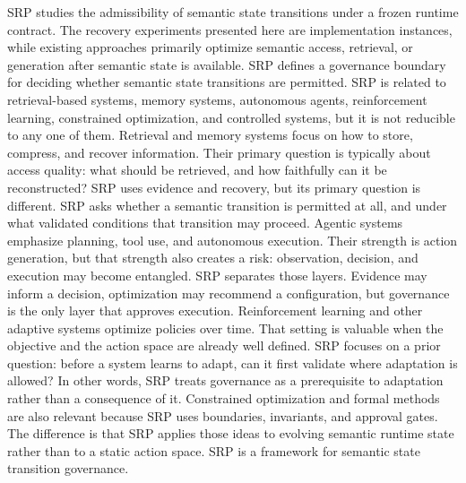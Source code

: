 {}SRP studies the admissibility of semantic state transitions under a frozen runtime contract. The recovery experiments presented here are implementation instances, while existing approaches primarily optimize semantic access, retrieval, or generation after semantic state is available.\markdownRendererSoftLineBreak
{}SRP defines a governance boundary for deciding whether semantic state transitions are permitted.\markdownRendererInterblockSeparator
{}
\markdownRendererSectionEnd \markdownRendererSectionBegin
{}\markdownRendererInterblockSeparator
{}SRP is related to retrieval-based systems, memory systems, autonomous agents, reinforcement learning, constrained optimization, and controlled systems, but it is not reducible to any one of them.\markdownRendererParagraphSeparator
{}Retrieval and memory systems focus on how to store, compress, and recover information. Their primary question is typically about access quality: what should be retrieved, and how faithfully can it be reconstructed? SRP uses evidence and recovery, but its primary question is different. SRP asks whether a semantic transition is permitted at all, and under what validated conditions that transition may proceed.\markdownRendererParagraphSeparator
{}Agentic systems emphasize planning, tool use, and autonomous execution. Their strength is action generation, but that strength also creates a risk: observation, decision, and execution may become entangled. SRP separates those layers. Evidence may inform a decision, optimization may recommend a configuration, but governance is the only layer that approves execution.\markdownRendererParagraphSeparator
{}Reinforcement learning and other adaptive systems optimize policies over time. That setting is valuable when the objective and the action space are already well defined. SRP focuses on a prior question: before a system learns to adapt, can it first validate where adaptation is allowed? In other words, SRP treats governance as a prerequisite to adaptation rather than a consequence of it.\markdownRendererParagraphSeparator
{}Constrained optimization and formal methods are also relevant because SRP uses boundaries, invariants, and approval gates. The difference is that SRP applies those ideas to evolving semantic runtime state rather than to a static action space.\markdownRendererInterblockSeparator
{}\markdownRendererSectionBegin
{}\markdownRendererInterblockSeparator
{}SRP is a framework for semantic state transition governance.\markdownRendererInterblockSeparator
